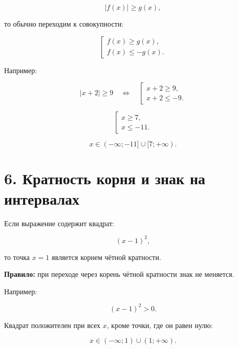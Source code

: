 \documentclass[a4paper,12pt]{article}
\begin{document}
\[
|f(x)|\ge g(x),
\]

то обычно переходим к совокупности:

\[
\left[
\begin{array}{l}
f(x)\ge g(x),\\
f(x)\le -g(x).
\end{array}
\right.
\]

Например:

\[
|x+2|\ge9
\quad\Longleftrightarrow\quad
\left[
\begin{array}{l}
x+2\ge9,\\
x+2\le-9.
\end{array}
\right.
\]

\[
\left[
\begin{array}{l}
x\ge7,\\
x\le-11.
\end{array}
\right.
\]

\[
x\in(-\infty;-11]\cup[7;+\infty).
\]

\section*{6. Кратность корня и знак на интервалах}

Если выражение содержит квадрат:

\[
(x-1)^2,
\]

то точка \(x=1\) является корнем чётной кратности.

\textbf{Правило:} при переходе через корень чётной кратности знак не меняется.

Например:

\[
(x-1)^2>0.
\]

Квадрат положителен при всех \(x\), кроме точки, где он равен нулю:

\[
x\in(-\infty;1)\cup(1;+\infty).
\]

\begin{center}
\end{center}
\end{document}
